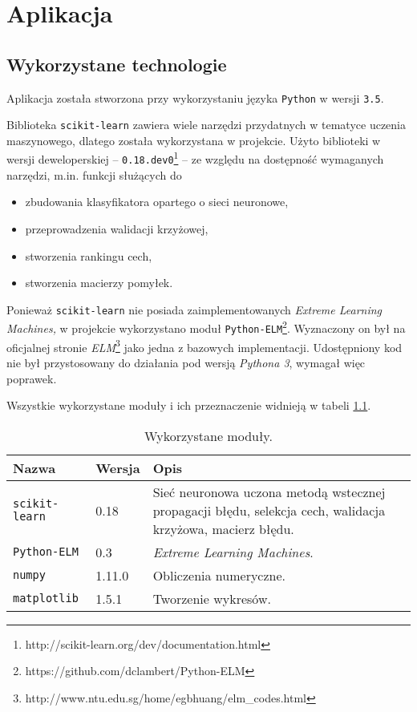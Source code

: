 \chapter{Aplikacja}

\section{Wykorzystane technologie}

Aplikacja została stworzona przy wykorzystaniu języka \texttt{Python} w wersji \texttt{3.5}.

Biblioteka \texttt{scikit-learn} zawiera wiele narzędzi przydatnych w tematyce uczenia maszynowego, dlatego została wykorzystana w projekcie.
Użyto biblioteki w wersji deweloperskiej -- \texttt{0.18.dev0}\footnote{http://scikit-learn.org/dev/documentation.html} -- ze względu na dostępność wymaganych narzędzi, m.in. funkcji służących do
\begin{itemize}
	\item{zbudowania klasyfikatora opartego o sieci neuronowe,}
	\item{przeprowadzenia walidacji krzyżowej,}
	\item{stworzenia rankingu cech,}
	\item{stworzenia macierzy pomyłek.}
\end{itemize}

Ponieważ \texttt{scikit-learn} nie posiada zaimplementowanych \textit{Extreme Learning Machines,} w projekcie wykorzystano moduł \texttt{Python-ELM}\footnote{https://github.com/dclambert/Python-ELM}. 
Wyznaczony on był na oficjalnej stronie \textit{ELM}\footnote{http://www.ntu.edu.sg/home/egbhuang/elm\_codes.html} jako jedna z bazowych implementacji.
Udostępniony kod nie był przystosowany do działania pod wersją \textit{Pythona 3}, wymagał więc poprawek.

\newpage

Wszystkie wykorzystane moduły i ich przeznaczenie widnieją w tabeli \ref{tab:usedmodules}.

\begin{table}[h!]
    \centering
    \caption{Wykorzystane moduły.}
    \label{tab:usedmodules}
    \begin{tabular}{p{3cm}p{2cm}p{11cm}}
        \toprule
        \textbf{Nazwa} & \textbf{Wersja} & \textbf{Opis} \\
        \midrule
        \texttt{scikit-learn} & 0.18 & Sieć neuronowa uczona metodą wstecznej propagacji błędu, selekcja cech, walidacja krzyżowa, macierz błędu. \\
        \texttt{Python-ELM} & 0.3 & \textit{Extreme Learning Machines}. \\
        \texttt{numpy} & 1.11.0 & Obliczenia numeryczne. \\
        \texttt{matplotlib} & 1.5.1 & Tworzenie wykresów. \\
        \bottomrule
    \end{tabular}
\end{table}

